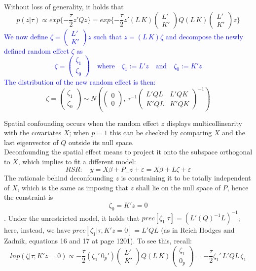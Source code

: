 \documentclass{article}
\begin{document}
Without loss of generality, it holds that
$$
p(z | \tau) \propto exp \lbrace -\dfrac{\tau}{2} z' Q z \rbrace = 
exp \lbrace -\dfrac{\tau}{2} z' (L \, K) \begin{pmatrix} L' \\ K'\end{pmatrix} 
Q (L \, K) \begin{pmatrix} L' \\ K'\end{pmatrix} z \rbrace
$$
\textcolor{blue}{
We now define
$\zeta = \begin{pmatrix} L' \\ K' \end{pmatrix} z$ such that $z = (L \, K) \zeta$ and decompose the newly defined random effect $\zeta$ as
$$
\zeta = \begin{pmatrix} \zeta_1 \\ \zeta_0 \end{pmatrix} \quad \text{where} \quad  \zeta_1 := L'z \quad \text{and} \quad \zeta_0 := K'z
$$ 
The distribution of the new random effect is then:
}
$$
\zeta = \begin{pmatrix} \zeta_1 \\ \zeta_0\end{pmatrix} \sim N \left(\begin{pmatrix} 0 \\ 0 \end{pmatrix}, \, \tau^{-1} \begin{pmatrix} L'QL & L'QK \\ K'QL & K'QK \end{pmatrix}^{-1} \right)
$$

Spatial confounding occurs when the random effect $z$ displays multicollinearity with the covariates $X$; when $p = 1$ this can be checked by comparing $X$ and the last eigenvector of $Q$ outside its null space. \\
Deconfounding the spatial effect means to project it onto the subspace orthogonal to $X$, which implies to fit a different model:
\begin{equation}
RSR: \quad y = X \beta + P_{\bot}z + \varepsilon = X \beta + L \zeta + \varepsilon
\end{equation}
The rationale behind deconfounding $z$ is constraining it to be totally independent of $X$, which is the same as imposing that $z$ shall lie on the null space of $P$, hence the constraint is $$ \zeta_0 = K'z = 0$$. Under the unrestricted model, it holds that $prec[\zeta_1 | \tau] = (L'(Q)^{-1}L)^{-1}$; here, instead, we have $prec[\zeta_1 | \tau, K'z = 0] = L'QL$ (as in Reich Hodges and Zadnik, equations 16 and 17 at page 1201). To see this, recall:
$$
ln p(\zeta | \tau; K'z = 0) \propto 
 -\dfrac{\tau}{2}  (\zeta_1' \, 0_{p}') \begin{pmatrix} L' \\ K'\end{pmatrix} 
Q (L \, K)  \begin{pmatrix} \zeta_1 \\ 0_{p} \end{pmatrix} = -\dfrac{\tau}{2} \zeta_1' \, L'QL \, \zeta_1
$$
\end{document}
